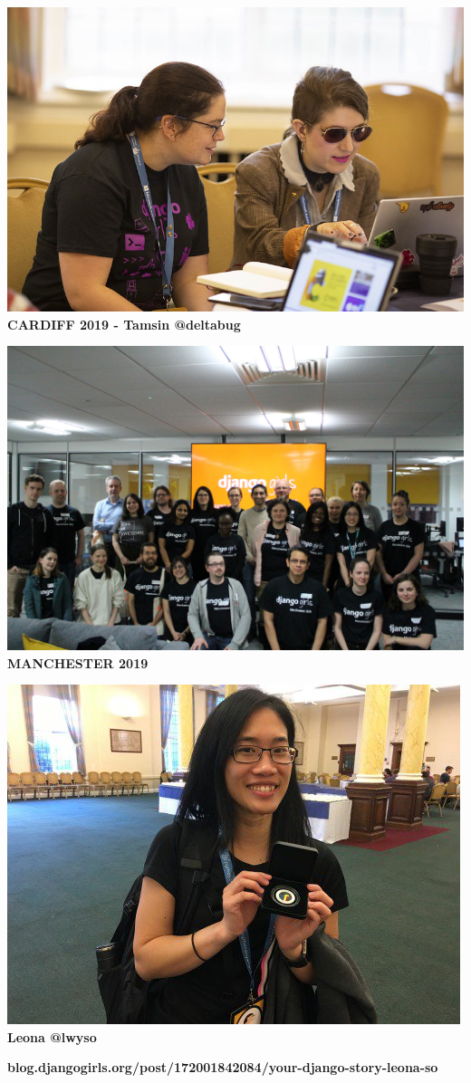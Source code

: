 \documentclass{beamer}
\begin{document}
\begin{frame}
    \begin{center}
    \includegraphics[width=.7\textwidth]{static/coach} \\
    \textbf{CARDIFF 2019 - Tamsin @deltabug}
    \end{center}
\end{frame}

\begin{frame}
    \begin{center}
        \includegraphics[width=.7\textwidth]{static/mcr_2019} \\
    \textbf{MANCHESTER 2019}
    \end{center}
\end{frame}

\begin{frame}
    \begin{center}
        \includegraphics[width=.7\textwidth]{static/leona} \\
    \textbf{Leona @lwyso}
    \vspace{1cm}

    \scriptsize{\textbf{blog.djangogirls.org/post/172001842084/your-django-story-leona-so}}
    \end{center}
\end{frame}
\end{document}
